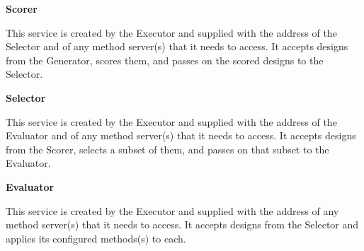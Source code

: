 \documentclass[10pt]{article}
\begin{document}
\vspace{3ex}
\noindent
\textbf{Scorer}

\noindent
This service is created by the Executor and supplied with the address of the 
Selector and of any method server(s) that it needs to access.
It accepts designs from the Generator, scores them, and passes on the scored
designs to the Selector.

\vspace{3ex}
\noindent
\textbf{Selector}

\noindent
This service is created by the Executor and supplied with the address of the 
Evaluator and of any method server(s) that it needs to access.
It accepts designs from the Scorer, selects a subset of them,
and passes on that subset to the Evaluator.

\vspace{3ex}
\noindent
\textbf{Evaluator}

\noindent
This service is created by the Executor and supplied with the address of any method server(s) that it needs to access.
It accepts designs from the Selector and applies its configured methods(s) to each.
\end{document}
